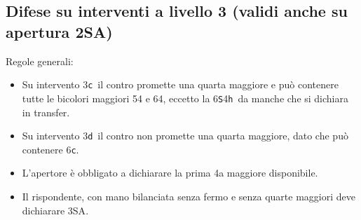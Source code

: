 \documentclass[a4paper,italian]{article}
\newcommand{\BS}{\small{\texttt{S}}}
\newcommand{\BC}{\small{\texttt{c}}}
\newcommand{\BD}{\small{\texttt{d}}}
\newcommand{\BH}{\small{\texttt{h}}}
\begin{document}
\begin{multicols}{2}
    \subsection{Difese su interventi a livello 3 (validi anche su apertura 2\small{SA})}

    Regole generali:
    \begin{itemize}
        \item Su intervento 3\BC\ il contro promette una quarta maggiore e può contenere tutte le bicolori maggiori 54 e 64, eccetto la 6\BS 4\BH\ da manche che si dichiara in transfer.
        \item Su intervento 3\BD\ il contro non promette una quarta maggiore, dato che può contenere 6\BC .
        \item L'apertore è obbligato a dichiarare la prima 4a maggiore disponibile.
        \item Il rispondente, con mano bilanciata senza fermo e senza quarte maggiori deve dichiarare 3\small{SA}.


\end{itemize}
\end{multicols}
\end{document}
